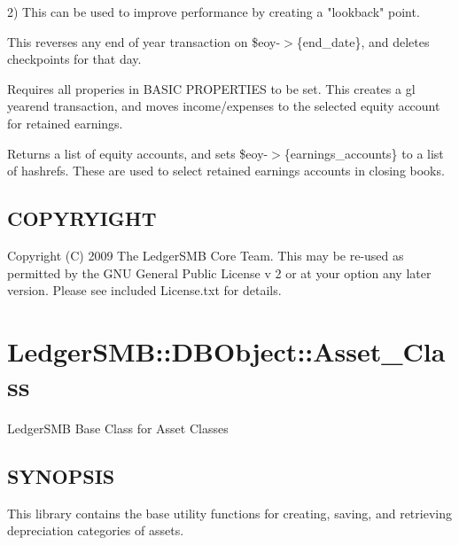 \begin{description}
\begin{description}
\begin{description}
\begin{description}
\begin{description}
\begin{description}
\begin{description}
\begin{description}
\begin{description}
\begin{description}
\begin{description}
2)  This can be used to improve performance by creating a "lookback" point.


\item[{\$eoy-$>$reopen\_books()}] \mbox{}

This reverses any end of year transaction on \$eoy-$>$\{end\_date\}, and deletes 
checkpoints for that day.


\item[{\$eoy-$>$close\_books()}] \mbox{}

Requires all properies in BASIC PROPERTIES to be set.  This creates a gl 
yearend transaction, and moves income/expenses to the selected equity account
for retained earnings.


\item[{\$eoy-$>$list\_earnings\_accounts}] \mbox{}

Returns a list of equity accounts, and sets \$eoy-$>$\{earnings\_accounts\} to a 
list of hashrefs.  These are used to select retained earnings accounts in 
closing books.

\end{description}
\subsection*{COPYRYIGHT\label{LedgerSMB::DBObject::EOY_COPYRYIGHT}}


Copyright (C) 2009 The LedgerSMB Core Team.  This may be re-used as permitted by
the GNU General Public License v 2 or at your option any later version.  Please
see included License.txt for details.

\section{LedgerSMB::DBObject::Asset\_Class\label{LedgerSMB::DBObject::Asset_Class}}


LedgerSMB Base Class for Asset Classes

\subsection*{SYNOPSIS\label{LedgerSMB::DBObject::Asset_Class_SYNOPSIS}}


This library contains the base utility functions for creating, saving, and
retrieving depreciation categories of assets.


\end{description}
\end{description}
\end{description}
\end{description}
\end{description}
\end{description}
\end{description}
\end{description}
\end{description}
\end{description}
